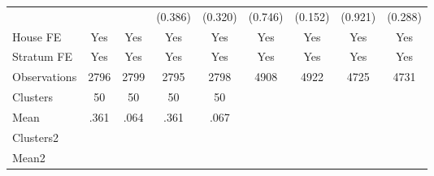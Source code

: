 {\begin{tabular}{l*{8}{c}}
                &                  &                  &  (0.386)         &  (0.320)         &  (0.746)         &  (0.152)         &  (0.921)         &  (0.288)         \\
House FE        &      Yes         &      Yes         &      Yes         &      Yes         &      Yes         &      Yes         &      Yes         &      Yes         \\
Stratum FE      &      Yes         &      Yes         &      Yes         &      Yes         &      Yes         &      Yes         &      Yes         &      Yes         \\
\midrule
Observations    &     2796         &     2799         &     2795         &     2798         &     4908         &     4922         &     4725         &     4731         \\
Clusters        &       50         &       50         &       50         &       50         &                  &                  &                  &                  \\
Mean            &     .361         &     .064         &     .361         &     .067         &                  &                  &                  &                  \\
Clusters2       &                  &                  &                  &                  &                  &                  &                  &                  \\
Mean2           &                  &                  &                  &                  &                  &                  &                  &                  \\
\bottomrule
\end{tabular}
}
